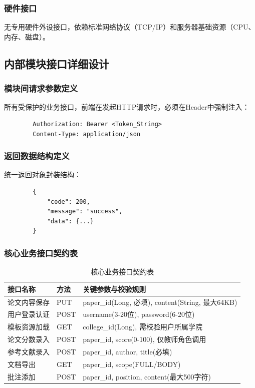 \documentclass{../template/softeng}
\begin{document}
	\subsubsection{硬件接口}
	无专用硬件外设接口，依赖标准网络协议（TCP/IP）和服务器基础资源（CPU、内存、磁盘）。

	\subsection{内部模块接口详细设计}

	\subsubsection{模块间请求参数定义}
	所有受保护的业务接口，前端在发起HTTP请求时，必须在Header中强制注入：
	\begin{verbatim}
		Authorization: Bearer <Token_String>
		Content-Type: application/json
	\end{verbatim}

	\subsubsection{返回数据结构定义}
	统一返回对象封装结构：
	\begin{verbatim}
		{
			"code": 200,
			"message": "success",
			"data": {...}
		}
	\end{verbatim}

	\subsubsection{核心业务接口契约表}
	\begin{table}[htbp]
		\centering
		\caption{核心业务接口契约表}
		\begin{tabular}{|p{3.5cm}|p{2cm}|p{5cm}|}
			\hline
			\textbf{接口名称} & \textbf{方法} & \textbf{关键参数与校验规则} \\
			\hline
			论文内容保存 & PUT & paper\_id(Long, 必填), content(String, 最大64KB) \\
			\hline
			用户登录认证 & POST & username(3-20位), password(6-20位) \\
			\hline
			模板资源加载 & GET & college\_id(Long), 需校验用户所属学院 \\
			\hline
			论文分数录入 & POST & paper\_id, score(0-100), 仅教师角色调用 \\
			\hline
			参考文献录入 & POST & paper\_id, author, title(必填) \\
			\hline
			文档导出 & GET & paper\_id, scope(FULL/BODY) \\
			\hline
			批注添加 & POST & paper\_id, position, content(最大500字符) \\
			\hline
		\end{tabular}
	\end{table}
\end{document}
